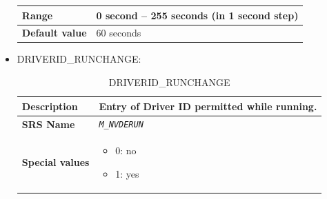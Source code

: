 \begin{itemize}
\begin{longtable}{|l|l|}
				\hline

					\begin{minipage}[t]{0.22\linewidth} \textbf{Range}	\end{minipage}
				&	\begin{minipage}[t]{0.78\linewidth} 0 second – 255 seconds (in 1 second step) \end{minipage} \\

				\hline

					\begin{minipage}[t]{0.22\linewidth} \textbf{Default value}	\end{minipage}
				&	\begin{minipage}[t]{0.78\linewidth} 60 seconds \end{minipage} \\

				\hline

			\end{longtable}

		\item DRIVERID\_RUNCHANGE:

			\begin{longtable}{|l|l|}
				\caption{DRIVERID\_RUNCHANGE}\\
				\hline

					\begin{minipage}[t]{0.22\linewidth} \textbf{Description}	\end{minipage}
				&	\begin{minipage}[t]{0.78\linewidth} Entry of Driver ID permitted while running. \end{minipage} \\

				\hline

					\begin{minipage}[t]{0.22\linewidth} \textbf{SRS Name}	\end{minipage}
				&	\begin{minipage}[t]{0.78\linewidth} \emph{\texttt{M\_NVDERUN}} \end{minipage} \\

				\hline

					\begin{minipage}[t]{0.22\linewidth} \textbf{Special values}	\end{minipage}
				&	\begin{minipage}[t]{0.78\linewidth} \begin{itemize} \item 0: no \item 1: yes \end{itemize} \end{minipage} \\


\end{longtable}
\end{itemize}
